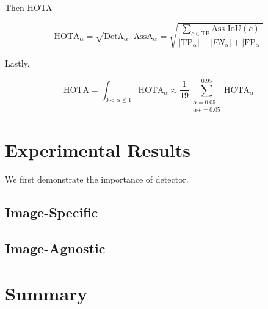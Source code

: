 Then HOTA

\begin{equation}
    \text{HOTA}_{\alpha} = \sqrt{\text{DetA}_{\alpha} \cdot \text{AssA}_{\alpha}} = \sqrt{\frac{\sum_{c \in \text{TP}} \text{Ass-IoU}(c)}{|\text{TP}_{\alpha}| + | FN_{\alpha}| + | \text{FP}_{\alpha}| }}
\end{equation}

Lastly,

\begin{equation}
    \text{HOTA} = \int_{0 < \alpha \leq 1} \text{HOTA}_{\alpha} \approx \frac{1}{19} \sum_{\substack{\alpha=0.05 \\ \alpha+= 0.05}}^{0.95} \text{HOTA}_{\alpha}
\end{equation}


\section{Experimental Results}

We first demonstrate the importance of detector.


\subsection{Image-Specific}


\clearpage

\subsection{Image-Agnostic}

\clearpage

\section{Summary}




